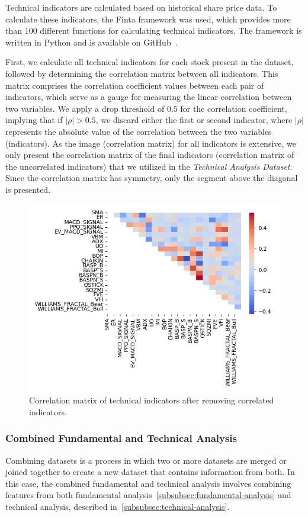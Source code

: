 \documentclass[../xlapes02]{subfiles}
\begin{document}
    Technical indicators are calculated based on historical share price data. To calculate these indicators, the Finta framework was used, which provides more than 100 different functions for calculating technical indicators. The framework is written in Python and is available on GitHub~\cite{finta}.

    First, we calculate all technical indicators for each stock present in the dataset, followed by determining the correlation matrix between all indicators. This matrix comprises the correlation coefficient values between each pair of indicators, which serve as a gauge for measuring the linear correlation between two variables. We apply a drop threshold of $0.5$ for the correlation coefficient, implying that if $|\rho| > 0.5$, we discard either the first or second indicator, where $|\rho|$ represents the absolute value of the correlation between the two variables (indicators). As the image (correlation matrix) for all indicators is extensive, we only present the correlation matrix of the final indicators (correlation matrix of the uncorrelated indicators) that we utilized in the \emph{Technical Analysis Dataset}. Since the correlation matrix has symmetry, only the segment above the diagonal is presented.
    \begin{figure}[h]
        \includegraphics[width=0.95\linewidth]{image/ta_correlation_matrix_uncorrelated_indicators}
        \centering
        \caption{Correlation matrix of technical indicators after removing correlated indicators.}
        \label{fig:ta_correlation_matrix_uncorrelated_indicators}
    \end{figure}

    \subsubsection{Combined Fundamental and Technical Analysis}\label{subsubsec:combined-fundamental-and-technical-analysis}
    Combining datasets is a process in which two or more datasets are merged or joined together to create a new dataset that contains information from both. In this case, the combined fundamental and technical analysis involves combining features from both fundamental analysis~\cref{subsubsec:fundamental-analysis} and technical analysis, described in~\cref{subsubsec:technical-analysis}.
\end{document}
